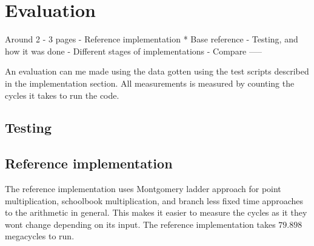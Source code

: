\section{Evaluation}
	Around 2 - 3 pages
    - Reference implementation
     * Base reference
    - Testing, and how it was done
    - Different stages of implementations
    - Compare
-----



An evaluation can me made using the data gotten using the test scripts described in the implementation section. All measurements is measured by counting the cycles it takes to run the code.

\subsection{Testing}



\subsection{Reference implementation}
The reference implementation uses Montgomery ladder approach for point multiplication, schoolbook multiplication, and branch less fixed time approaches to the arithmetic in general. This makes it easier to measure the cycles as it they wont change depending on its input. The reference implementation takes $79.898$ megacycles to run.

